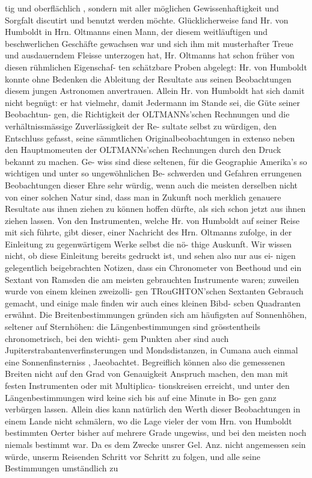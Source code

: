 \documentclass[12pt,a4paper]{article}
\begin{document}
tig  und  oberflächlich ,  sondern  mit  aller  möglichen  Gewissenhaftigkeit  und  Sorgfalt  discutirt  und  benutzt werden  möchte.  Glücklicherweise  fand  Hr.  von  Humboldt  in  Hrn.  Oltmanns  einen  Mann,  der  diesem weitläuftigen  und  beschwerlichen  Geschäfte  gewachsen  war  und  sich  ihm  mit  musterhafter  Treue  und ausdauerndem  Fleisse  unterzogen  hat,  Hr.  Oltmanns  hat  schon  früher  von  diesen  rühmlichen  Eigenschaf- ten schätzbare  Proben  abgelegt:  Hr.  von  Humboldt  konnte  ohne  Bedenken  die  Ableitung  der  Resultate aus  seinen  Beobachtungen  diesem  jungen  Astronomen  anvertrauen.  Allein  Hr.  von  Humboldt  hat  sich damit  nicht  begnügt:  er  hat  vielmehr,  damit  Jedermann  im  Stande  sei,  die  Güte  seiner  Beobachtun- gen, die  Richtigkeit  der  OLTMANNs'schen  Rechnungen  und  die  verhältnissmässige  Zuverlässigkeit  der  Re- sultate selbst  zu  würdigen,  den  Entschluss  gefasst,  seine  sämmtlichen  Originalbeobachtungen  in  extenso neben  den  Hauptmomeuten  der  OLTMANNs'schen  Rechnungen  durch  den  Druck  bekannt  zu  machen.  Ge- wiss sind  diese  seltenen,  für  die  Geographie  Amerika's  so  wichtigen  und  unter  so  ungewöhnlichen  Be- schwerden und  Gefahren  errungenen  Beobachtungen  dieser  Ehre  sehr  würdig,  wenn  auch  die  meisten derselben  nicht  von  einer  solchen  Natur  sind,  dass  man  in  Zukunft  noch  merklich  genauere  Resultate aus  ihnen  ziehen  zu  können  hoffen  dürfte,  als  sich  schon  jetzt  aus  ihnen  ziehen  lassen. Von  den  Instrumenten,  welche  Hr.  von  Humboldt  auf  seiner  Reise  mit  sich  führte,  gibt  dieser, einer  Nachricht  des  Hrn.  Oltmanns  zufolge,  in  der  Einleitung  zu  gegenwärtigem  Werke  selbst  die  nö- thige  Auskunft.  Wir  wissen  nicht,  ob  diese  Einleitung  bereits  gedruckt  ist,  und  sehen  also  nur  aus  ei- nigen gelegentlich  beigebrachten  Notizen,  dass  ein  Chronometer  von  Beethoud  und  ein  Sextant  von Ramsden  die  am  meisten  gebrauchten  Instrumente  waren;  zuweilen  wurde  von  einem  kleinen  zweizolli- gen  TRouGHTON'schen  Sextanten  Gebrauch  gemacht,  und  einige  male  finden  wir  auch  eines  kleinen  Bibd- scben  Quadranten  erwähnt.  Die  Breitenbestimmungen  gründen  sich  am  häufigsten  auf  Sonnenhöhen, seltener  auf  Sternhöhen:  die  Längenbestimmungen  sind  grösstentheils  chronometrisch,  bei  den  wichti- gem Punkten  aber  sind  auch  Jupiterstrabantenverfinsterungen  und  Mondsdistanzen,  in  Cumana  auch einmal  eine  Sonnenfinsterniss ,  Jaeobachtet.  Begreiflich  können  also  die  gemessenen  Breiten  nicht  auf den  Grad  von  Genauigkeit  Anspruch  machen,  den  man  mit  festen  Instrumenten  oder  mit  Multiplica- tionskreisen  erreicht,  und  unter  den  Längenbestimmungen  wird  keine  sich  bis  auf  eine  Minute  in  Bo- gen ganz  verbürgen  lassen.  Allein  dies  kann  natürlich  den  Werth  dieser  Beobachtungen  in  einem  Lande nicht  schmälern,  wo  die  Lage  vieler  der  vom  Hrn.  von  Humboldt  bestimmten  Oerter  bisher  auf  mehrere Grade  ungewiss,  und  bei  den  meisten  noch  niemals  bestimmt  war. Da  es  dem  Zwecke  unsrer  Gel.  Anz.  nicht  angemessen  sein  würde,  unserm  Reisenden  Schritt  vor Schritt  zu  folgen,  und  alle  seine  Bestimmungen  umständlich  zu 
\end{document}
